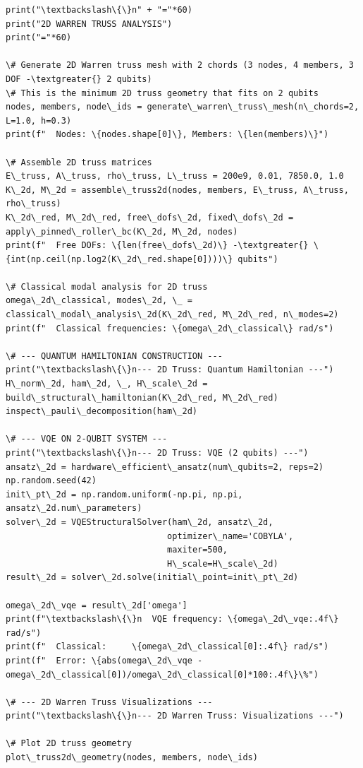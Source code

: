 \documentclass[12pt, a4paper]{article}
\begin{document}
\begin{lstlisting}[style=codestyle, caption={{main.py --- Pipeline Orchestrator}}]
print("\textbackslash\{\}n" + "="*60)
print("2D WARREN TRUSS ANALYSIS")
print("="*60)

\# Generate 2D Warren truss mesh with 2 chords (3 nodes, 4 members, 3 DOF -\textgreater{} 2 qubits)
\# This is the minimum 2D truss geometry that fits on 2 qubits
nodes, members, node\_ids = generate\_warren\_truss\_mesh(n\_chords=2, L=1.0, h=0.3)
print(f"  Nodes: \{nodes.shape[0]\}, Members: \{len(members)\}")

\# Assemble 2D truss matrices
E\_truss, A\_truss, rho\_truss, L\_truss = 200e9, 0.01, 7850.0, 1.0
K\_2d, M\_2d = assemble\_truss2d(nodes, members, E\_truss, A\_truss, rho\_truss)
K\_2d\_red, M\_2d\_red, free\_dofs\_2d, fixed\_dofs\_2d = apply\_pinned\_roller\_bc(K\_2d, M\_2d, nodes)
print(f"  Free DOFs: \{len(free\_dofs\_2d)\} -\textgreater{} \{int(np.ceil(np.log2(K\_2d\_red.shape[0])))\} qubits")

\# Classical modal analysis for 2D truss
omega\_2d\_classical, modes\_2d, \_ = classical\_modal\_analysis\_2d(K\_2d\_red, M\_2d\_red, n\_modes=2)
print(f"  Classical frequencies: \{omega\_2d\_classical\} rad/s")

\# --- QUANTUM HAMILTONIAN CONSTRUCTION ---
print("\textbackslash\{\}n--- 2D Truss: Quantum Hamiltonian ---")
H\_norm\_2d, ham\_2d, \_, H\_scale\_2d = build\_structural\_hamiltonian(K\_2d\_red, M\_2d\_red)
inspect\_pauli\_decomposition(ham\_2d)

\# --- VQE ON 2-QUBIT SYSTEM ---
print("\textbackslash\{\}n--- 2D Truss: VQE (2 qubits) ---")
ansatz\_2d = hardware\_efficient\_ansatz(num\_qubits=2, reps=2)
np.random.seed(42)
init\_pt\_2d = np.random.uniform(-np.pi, np.pi, ansatz\_2d.num\_parameters)
solver\_2d = VQEStructuralSolver(ham\_2d, ansatz\_2d,
                                optimizer\_name='COBYLA',
                                maxiter=500,
                                H\_scale=H\_scale\_2d)
result\_2d = solver\_2d.solve(initial\_point=init\_pt\_2d)

omega\_2d\_vqe = result\_2d['omega']
print(f"\textbackslash\{\}n  VQE frequency: \{omega\_2d\_vqe:.4f\} rad/s")
print(f"  Classical:     \{omega\_2d\_classical[0]:.4f\} rad/s")
print(f"  Error: \{abs(omega\_2d\_vqe - omega\_2d\_classical[0])/omega\_2d\_classical[0]*100:.4f\}\%")

\# --- 2D Warren Truss Visualizations ---
print("\textbackslash\{\}n--- 2D Warren Truss: Visualizations ---")

\# Plot 2D truss geometry
plot\_truss2d\_geometry(nodes, members, node\_ids)


\end{lstlisting}
\end{document}

